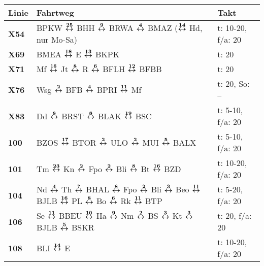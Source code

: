\begin{minipage}[t]{0.45\textwidth}
\begin{tabular}{>{\bfseries}L{1.2cm}L{9.0cm}L{3.0cm}}
{\bfseries Linie} & {\bfseries Fahrtweg} & {\bfseries Takt} \\
\hline
\xbus{} X54   & BPKW $\xarwe{25}$ BHH $\xarwe{9}$ BRWA $\xarwe{4}$ BMAZ ($\xarwe{14}$ Hd, nur Mo-Sa)                                                                                & t: 10-20, f/a: 20          \\
\xbus{} X69   & BMEA $\xarwe{18}$ E $\xarwe{13}$ BKPK
& t: 20                      \\
\xbus{} X71   & Mf $\xarwe{16}$ Jt $\xarwe{8}$ R $\xarwe{6}$ BFLH $\xarwe{12}$ BFBB                               & t: 20                  \\
\xbus{} X76   & Wsg $\xarwe{2}$ BFB $\xarwe{4}$ BPRI $\xarwe{11}$ Mf                                                                                                                & t: 20, So: --              \\
\xbus{} X83   & Dd $\xarwe{8}$ BRST $\xarwe{8}$ BLAK $\xarwe{19}$ BSC                                                                                                               & t: 5-10, f/a: 20           \\
\bus{} 100    & BZOS $\xarwe{17}$ BTOR $\xarwe{2}$ ULO $\xarwe{2}$ MUI $\xarwe{5}$ BALX                                                                                             & t: 5-10, f/a: 20           \\
\bus{} 101    & Tm $\xarwe{23}$ Kn $\xarwe{2}$ Fpo $\xarwe{2}$ Bli $\xarwe{8}$ Bt $\xarwe{16}$ BZD                                                                                  & t: 10-20, f/a: 20          \\
\bus{} 104    & Nd $\xarwe{4}$ Th $\xarwe{7}$ BHAL $\xarwe{8}$ Fpo $\xarwe{2}$ Bli $\xarwe{3}$ Beo $\xarwe{11}$ BJLB $\xarwe{16}$ PL $\xarwe{8}$ Bo $\xarwe{6}$ Rk $\xarwe{11}$ BTP & t: 5-20, f/a: 20           \\
\bus{} 106    & Se $\xarwe{11}$ BBEU $\xarwe{10}$ Ha $\xarwe{9}$ Nm $\xarwe{2}$ BS $\xarwe{3}$ Kt $\xarwe{3}$ BJLB $\xarwe{5}$ BSKR                                                 & t: 20, f/a: 20             \\
\bus{} 108    & BLI $\xarwe{14}$ E                                                                                                                                                  & t: 10-20, f/a: 20          \\

\end{tabular}
\end{minipage}
